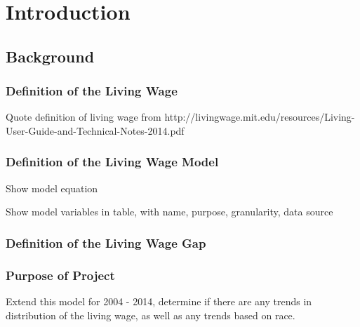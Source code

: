 \chapter{Introduction}\label{ch:introduction}

\section{Background}

\subsection{Definition of the Living Wage}

Quote definition of living wage from http://livingwage.mit.edu/resources/Living-User-Guide-and-Technical-Notes-2014.pdf

\subsection{Definition of the Living Wage Model}

Show model equation

Show model variables in table, with name, purpose, granularity, data source

\subsection{Definition of the Living Wage Gap}

\subsection{Purpose of Project}

Extend this model for 2004 - 2014, determine if there are any trends in distribution of the living wage, as well as any trends based on race.



%


